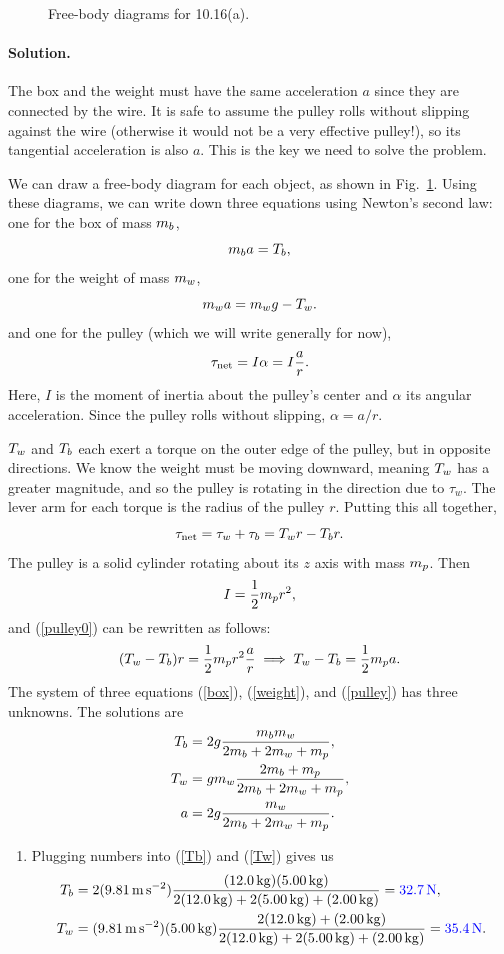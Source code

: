 \documentclass[11pt]{article}
\newcommand{\refeq}[1]{(\ref{#1})}
\newcommand{\beq}{\begin{equation*}}
\newcommand{\eeq}{\end{equation*}}
\newcommand{\beqn}{\begin{equation}}
\newcommand{\eeqn}{\end{equation}}
\newenvironment{solution}
{
    \paragraph{Solution.}
    \ignorespaces
}
{
    \bigskip
}
\begin{document}
\begin{figure}
	\vspace{1.5in}
	\caption{Free-body diagrams for 10.16(a).}
	\label{E10.16a}
\end{figure}

\begin{solution}
	The box and the weight must have the same acceleration $a$ since they are connected by the wire.  It is safe to assume the pulley rolls without slipping against the wire (otherwise it would not be a very effective pulley!), so its tangential acceleration is also $a$.  This is the key we need to solve the problem.
	
	We can draw a free-body diagram for each object, as shown in Fig.~\ref{E10.16a}.  Using these diagrams, we can write down three equations using Newton's second law: one for the box of mass $m_b$,
	\beqn \label{box}
		\mb a = \Tb,
	\eeqn
	one for the weight of mass $m_w$,
	\beqn \label{weight}
		\mw a = \mw g - \Tw.
	\eeqn
	and one for the pulley (which we will write generally for now),
	\beqn \label{pulley0}
		\tnet = I \alpha = I \frac{a}{r}.
	\eeqn
	Here, $I$ is the moment of inertia about the pulley's center and $\alpha$ its angular acceleration.  Since the pulley rolls without slipping, $\alpha = a / r$.
			
	$T_w$ and $T_b$ each exert a torque on the outer edge of the pulley, but in opposite directions.  We know the weight must be moving downward, meaning $T_w$ has a greater magnitude, and so the pulley is rotating in the direction due to $\tau_w$.  The lever arm for each torque is the radius of the pulley $r$.  Putting this all together,
	\beq
		\tnet = \tau_w + \tau_b = \Tw r - \Tb r.
	\eeq
	The pulley is a solid cylinder rotating about its $z$ axis with mass $m_p$.  Then
	\beq
		I = \frac{1}{2} \mmp r^2,
	\eeq
	and \refeq{pulley0} can be rewritten as follows:
	\beqn \label{pulley}
		(\Tw - \Tb) r = \frac{1}{2} \mmp r^2 \frac{a}{r} \implies \Tw - \Tb = \frac{1}{2} \mmp a.
	\eeqn
	The system of three equations \refeq{box}, \refeq{weight}, and \refeq{pulley} has three unknowns.  The solutions are
	\begin{align}
		T_b &= 2g \frac{m_b m_w}{2 m_b + 2 m_w + m_p}, \label{Tb} \\
		T_w &= g m_w \frac{2 m_b + m_p}{2 m_b + 2 m_w + m_p}, \label{Tw} \\
		a &= 2g \frac{m_w}{2 m_b + 2 m_w + m_p}. \label{acc}
	\end{align}
			
	\begin{enumerate}
		\item Plugging numbers into \refeq{Tb} and \refeq{Tw} gives us
			\begin{align*}
				\Tb &= 2 (\sig) \frac{(\simb) (\simw)}{2 (\simb) + 2 (\simw) + (\simp)} = {\color{blue} \SI{32.7}{\newton}}, \\
				\Tw &= (\sig) (\simw) \frac{2 (\simb) + (\simp)}{2 (\simb) + 2 (\simw) + (\simp)} = {\color{blue} \SI{35.4}{\newton}}.
			\end{align*}
		

\end{enumerate}
\end{solution}
\end{document}
